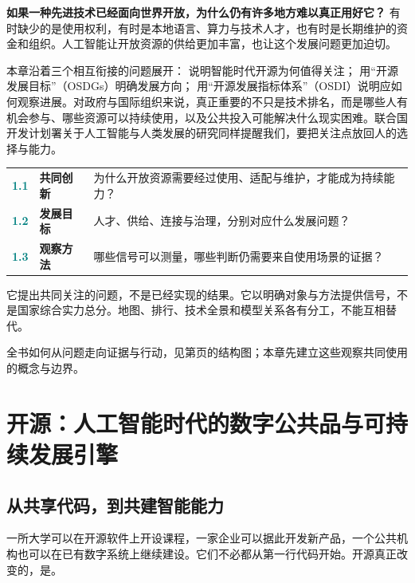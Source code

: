 \noindent\textbf{如果一种先进技术已经面向世界开放，为什么仍有许多地方难以真正用好它？} 有时缺少的是使用权利，有时是本地语言、算力与技术人才，也有时是长期维护的资金和组织。人工智能让开放资源的供给更加丰富，也让这个发展问题更加迫切。


本章沿着三个相互衔接的问题展开： 说明智能时代开源为何值得关注； 用“开源发展目标”（OSDGs）明确发展方向； 用“开源发展指标体系”（OSDI）说明应如何观察进展。对政府与国际组织来说，真正重要的不只是技术排名，而是哪些人有机会参与、哪些资源可以持续使用，以及公共投入可能解决什么现实困难。联合国开发计划署关于人工智能与人类发展的研究同样提醒我们，要把关注点放回人的选择与能力。

\begingroup\fontsize{11}{17}\selectfont\renewcommand{\arraystretch}{1.5}
\noindent\begin{tabularx}{\linewidth}{@{}>{\sffamily\bfseries}p{12mm}>{\sffamily\bfseries}p{29mm}X@{}}
\toprule
\textcolor{teal}{1.1} & 共同创新 & 为什么开放资源需要经过使用、适配与维护，才能成为持续能力？\\
\textcolor{teal}{1.2} & 发展目标 & 人才、供给、连接与治理，分别对应什么发展问题？\\
\textcolor{teal}{1.3} & 观察方法 & 哪些信号可以测量，哪些判断仍需要来自使用场景的证据？\\
\bottomrule
\end{tabularx}\endgroup
\vspace{3mm}
它提出共同关注的问题，不是已经实现的结果。它以明确对象与方法提供信号，不是国家综合实力总分。地图、排行、技术全景和模型关系各有分工，不能互相替代。

\noindent 全书如何从问题走向证据与行动，见第\pageref{ch1-architecture}页的结构图；本章先建立这些观察共同使用的概念与边界。

\clearpage\section{开源：人工智能时代的数字公共品与可持续发展引擎}\label{ch1-ch1sec1}
\subsection{从共享代码，到共建智能能力}
一所大学可以在开源软件上开设课程，一家企业可以据此开发新产品，一个公共机构也可以在已有数字系统上继续建设。它们不必都从第一行代码开始。开源真正改变的，是。

